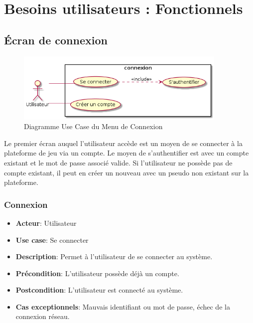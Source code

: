 \documentclass{article}
\begin{document}
\newpage

\section{Besoins utilisateurs : Fonctionnels}

\subsection{Écran de connexion}

\begin{figure}[!h]
    \centering
    	\includegraphics[width=0.9\textwidth]{../res/uml/usecase/ConnexionUseCase.png}
    	\caption{Diagramme Use Case du Menu de Connexion}
    	\label{fig:main-menu}
\end{figure}
Le premier écran auquel l'utilisateur accède est un moyen de se connecter à la plateforme de jeu via un compte. Le moyen de s'authentifier est avec un compte existant et le mot de passe associé valide. Si l'utilisateur ne possède pas de compte existant, il peut en créer un nouveau avec un pseudo non existant sur la plateforme.


\subsubsection*{Connexion}
\begin{itemize}
    \item \textbf{Acteur}: Utilisateur
    \item \textbf{Use case}: Se connecter
    \item \textbf{Description}: Permet à l'utilisateur de se connecter au système.
    \item \textbf{Précondition}: L'utilisateur possède déjà un compte.
    \item \textbf{Postcondition}: L'utilisateur est connecté au système.
    \item \textbf{Cas exceptionnels}: Mauvais identifiant ou mot de passe, échec de la connexion réseau.
\end{itemize}
\end{document}
